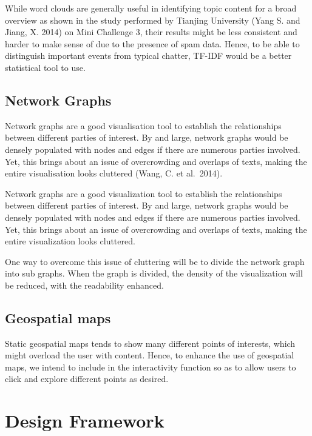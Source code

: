 \documentclass{acm_proc_article-sp}
\begin{document}
While word clouds are generally useful in identifying topic content for
a broad overview as shown in the study performed by Tianjing University
(Yang S. and Jiang, X. 2014) on Mini Challenge 3, their results might be
less consistent and harder to make sense of due to the presence of spam
data. Hence, to be able to distinguish important events from typical
chatter, TF-IDF would be a better statistical tool to use.

\hypertarget{network-graphs}{%
\subsection{Network Graphs}\label{network-graphs}}

Network graphs are a good visualisation tool to establish the
relationships between different parties of interest. By and large,
network graphs would be densely populated with nodes and edges if there
are numerous parties involved. Yet, this brings about an issue of
overcrowding and overlaps of texts, making the entire visualisation
looks cluttered (Wang, C. et al.~2014).

Network graphs are a good visualization tool to establish the
relationships between different parties of interest. By and large,
network graphs would be densely populated with nodes and edges if there
are numerous parties involved. Yet, this brings about an issue of
overcrowding and overlaps of texts, making the entire visualization
looks cluttered.

One way to overcome this issue of cluttering will be to divide the
network graph into sub graphs. When the graph is divided, the density of
the visualization will be reduced, with the readability enhanced.

\hypertarget{geospatial-maps}{%
\subsection{Geospatial maps}\label{geospatial-maps}}

Static geospatial maps tends to show many different points of interests,
which might overload the user with content. Hence, to enhance the use of
geospatial maps, we intend to include in the interactivity function so
as to allow users to click and explore different points as desired.

\hypertarget{design-framework}{%
\section{Design Framework}\label{design-framework}}
\end{document}
